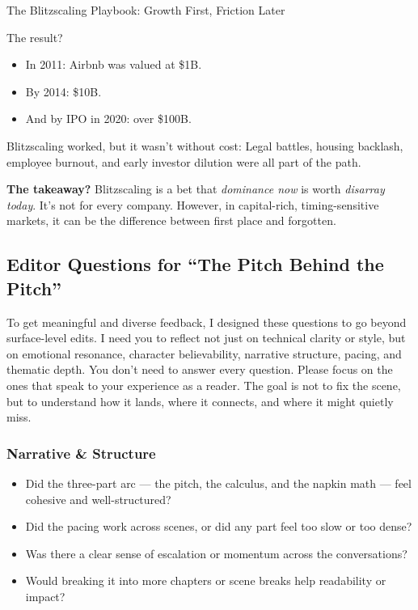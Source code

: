 \begin{HistoricalSidebar}{The Blitzscaling Playbook: Growth First, Friction Later}
  \medskip
  
  The result?

  \medskip
  
  \begin{itemize}
    \item In 2011: Airbnb was valued at \$1B.
    \item By 2014: \$10B.
    \item And by IPO in 2020: over \$100B.
  \end{itemize}
  
  \medskip
  
  Blitzscaling worked, but it wasn't without cost:  
  Legal battles, housing backlash, employee burnout, and early investor dilution were all part of the path.
  
  \medskip
  
  \textbf{The takeaway?}  
  Blitzscaling is a bet that \textit{dominance now} is worth \textit{disarray today}.  
  It’s not for every company. However, in capital-rich, timing-sensitive markets, it can be the difference between first place 
  and forgotten.
  
\end{HistoricalSidebar}


\subsection*{Editor Questions for ``The Pitch Behind the Pitch''}

To get meaningful and diverse feedback, I designed these questions to go beyond surface-level edits.
I need you to reflect not just on technical clarity or style, but on emotional resonance, character
believability, narrative structure, pacing, and thematic depth. You don’t need to answer every question.
Please focus on the ones that speak to your experience as a reader. The goal is not to fix the scene,
but to understand how it lands, where it connects, and where it might quietly miss.

\subsubsection*{Narrative \& Structure}

\begin{itemize}
\item Did the three-part arc — the pitch, the calculus, and the napkin math — feel cohesive and well-structured?
\item Did the pacing work across scenes, or did any part feel too slow or too dense?
\item Was there a clear sense of escalation or momentum across the conversations?
\item Would breaking it into more chapters or scene breaks help readability or impact?
\end{itemize}

